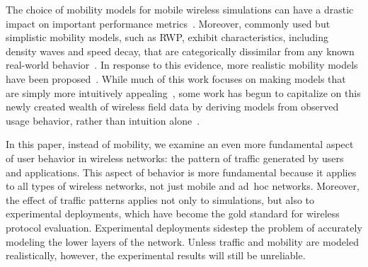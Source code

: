 \documentclass[conference]{IEEEtran}
\newcommand{\caps}[1]{{\small{#1}}}
\begin{document}
The choice of mobility models for mobile wireless simulations can have a drastic impact on important performance metrics~\cite{Camp02,Yoon03:speed-decay,Yoon03:sound-models,Jardosh03,Zheng04}. Moreover, commonly used but simplistic mobility models, such as \caps{RWP}, exhibit characteristics, including density waves and speed decay, that are categorically dissimilar from any known real-world behavior~\cite{Royer01,Yoon03:speed-decay,Yoon03:sound-models}. In response to this evidence, more realistic mobility models have been proposed~\cite{Jardosh03,Tuduce05,Jardosh05:voronoi}. While much of this work focuses on making models that are simply more intuitively appealing~\cite{Jardosh03,Jardosh05:voronoi}, some work has begun to capitalize on this newly created wealth of wireless field data by deriving models from observed usage behavior, rather than intuition alone~\cite{Balazinska03,Tuduce05}.

In this paper, instead of mobility, we examine an even more fundamental aspect of user behavior in wireless networks: the pattern of traffic generated by users and applications. This aspect of behavior is more fundamental because it applies to all types of wireless networks, not just mobile and ad~hoc networks. Moreover, the effect of traffic patterns applies not only to simulations, but also to experimental deployments, which have become the gold standard for wireless protocol evaluation.  Experimental deployments sidestep the problem of accurately modeling the lower layers of the network. Unless traffic and mobility are modeled realistically, however, the experimental results will still be unreliable.
\end{document}

